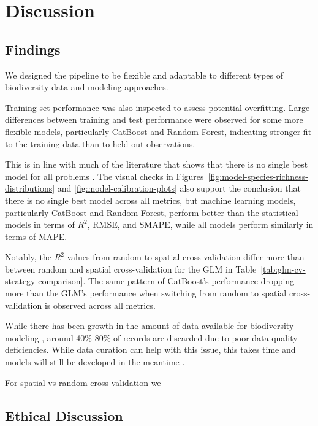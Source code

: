 \section{Discussion}\label{sec:discussion}
\subsection{Findings}\label{sec:dis}
We designed the pipeline to be flexible and adaptable to different types of biodiversity data and modeling approaches. 


Training-set performance was also inspected to assess potential overfitting. Large differences between training and test performance were observed for some more flexible models, particularly CatBoost and Random Forest, indicating stronger fit to the training data than to held-out observations.

 This is in line with much of the literature that shows that there is no single best model for all problems \parencite{mondal2021, cai2023, baggstrom2025}. The visual checks in Figures~\ref{fig:model-species-richness-distributions} and \ref{fig:model-calibration-plots} also support the conclusion that there is no single best model across all metrics, but machine learning models, particularly CatBoost and Random Forest, perform better than the statistical models in terms of \(R^2\), RMSE, and SMAPE, while all models perform similarly in terms of MAPE.

Notably, the \(R^2\) values from random to spatial cross-validation differ more than between random and spatial cross-validation for the GLM in Table~\ref{tab:glm-cv-strategy-comparison}. The same pattern of CatBoost's performance dropping more than the GLM's performance when switching from random to spatial cross-validation is observed across all metrics. 

While there has been growth in the amount of data available for biodiversity modeling \parencite{wuest2020}, around 40\%-80\% of records are discarded due to poor data quality deficiencies\parencite{vargas2024}. While data curation can help with this issue, this takes time and models will still be developed in the meantime \parencite{vargas2024}.

For spatial vs random cross validation we 
\subsection{Ethical Discussion}\label{sec:ethics}